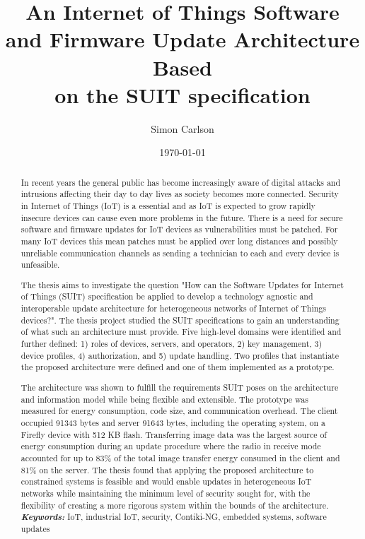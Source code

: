\documentclass{kththesis}
\title{An Internet of Things Software and Firmware Update Architecture Based\\on the SUIT specification}
\author{Simon Carlson}
\date{\today}
\providecommand{\keywords}[1]{\textbf{\textit{Keywords:}} #1}
\begin{document}
\frontmatter

\titlepage

\begin{abstract}
In recent years the general public has become increasingly aware of digital attacks and
intrusions affecting their day to day lives as society becomes more connected. Security in
Internet of Things (IoT) is a essential and as IoT is expected to grow rapidly insecure
devices can cause even more problems in the future. There is a need for secure software
and firmware updates for IoT devices as vulnerabilities must be patched. For many IoT
devices this mean patches must be applied over long distances and possibly unreliable
communication channels as sending a technician to each and every device is unfeasible. 

The thesis aims to investigate the question "How can the Software Updates for Internet of
Things (SUIT) specification be applied to develop a technology agnostic and interoperable
update architecture for heterogeneous networks of Internet of Things devices?". The thesis
project studied the SUIT specifications to gain an understanding of what such an
architecture must provide. Five high-level domains were identified and further defined: 1)
roles of devices, servers, and operators, 2) key management, 3) device profiles, 4)
authorization, and 5) update handling. Two profiles that instantiate the proposed
architecture were defined and one of them implemented as a prototype. 

The architecture was shown to fulfill the requirements SUIT poses on the architecture and
information model while being flexible and extensible. The prototype was measured for
energy consumption, code size, and communication overhead. The client occupied 91343 bytes
and server 91643 bytes, including the operating system, on a Firefly device with 512 KB
flash. Transferring image data was the largest source of energy consumption during an
update procedure where the radio in receive mode accounted for up to 83\% of the total
image transfer energy consumed in the client and 81\% on the server. The thesis found that
applying the proposed architecture to constrained systems is feasible and would enable
updates in heterogeneous IoT networks while maintaining the minimum level of security
sought for, with the flexibility of creating a more rigorous system within the bounds of
the architecture.\\

\noindent\keywords{IoT, industrial IoT, security, Contiki-NG, embedded systems, 
                    software updates}
\end{abstract}
\end{document}
